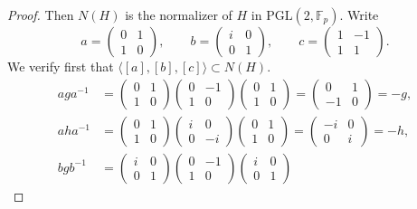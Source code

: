 \documentclass[11pt,a4paper]{article}
\newcommand{\F}{\mathbb{F}}
\begin{document}
{\begin{proof}
Then $N(H)$ is the normalizer of $H$ in $\mathrm{PGL}(2,\F_p)$. Write
$$a = \begin{pmatrix} 0 & 1\\1 & 0\end{pmatrix}, \qquad b= \begin{pmatrix} i & 0\\0 & 1 \end{pmatrix}, \qquad c = \begin{pmatrix} 1 & -1\\1 & 1 \end{pmatrix}.$$
We verify first that $\langle[a],[b],[c]\rangle \subset N(H)$.
\begin{align*}
aga^{-1}& = \begin{pmatrix} 0 & 1\\1 & 0 \end{pmatrix}\begin{pmatrix} 0 & -1\\1 & 0 \end{pmatrix}\begin{pmatrix} 0 & 1\\1 & 0 \end{pmatrix}
= \begin{pmatrix} 0 & 1\\-1 & 0 \end{pmatrix} = -g,\\
aha^{-1} &=\begin{pmatrix} 0 & 1\\1 & 0 \end{pmatrix}\begin{pmatrix} i & 0 \\0 & -i \end{pmatrix}\begin{pmatrix} 0 & 1\\1 & 0 \end{pmatrix}
= \begin{pmatrix} -i & 0 \\0 & i \end{pmatrix} = -h,\\
bgb^{-1} &=\begin{pmatrix} i & 0\\0 & 1 \end{pmatrix}\begin{pmatrix} 0 & -1\\1 & 0 \end{pmatrix}   \begin{pmatrix} i & 0\\0 & 1 \end{pmatrix}

\end{align*}
\end{proof}}
\end{document}
